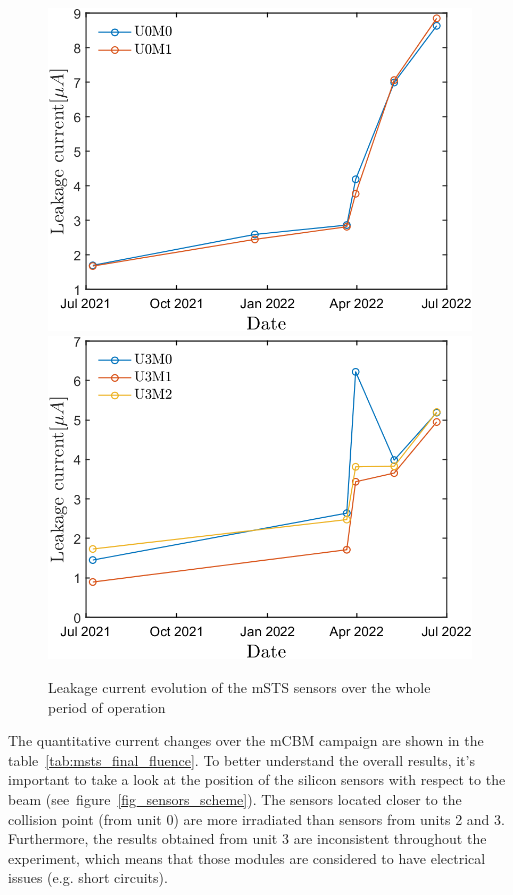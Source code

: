\begin{figure}[!h]
\centering
\includegraphics[width=0.45\columnwidth]{Chapter6/DCS/images/sensors/U0_leakage.png}
\includegraphics[width=0.45\columnwidth]{Chapter6/DCS/images/sensors/U3_leakage.png}
\caption{Leakage current evolution of the \gls{mSTS} sensors over the whole period of operation}
\label{fig_leak}
\end{figure}

\newpage
The quantitative current changes over the \gls{mCBM} campaign are shown in the table~\ref{tab:msts_final_fluence}. To better understand the overall results, it's important to take a look at the position of the silicon sensors with respect to the beam (see~figure~\ref{fig_sensors_scheme}). The sensors located closer to the collision point (from unit 0) are more irradiated than sensors from units 2 and 3. Furthermore, the results obtained from unit 3 are inconsistent throughout the experiment, which means that those modules are considered to have electrical issues (e.g. short circuits).


